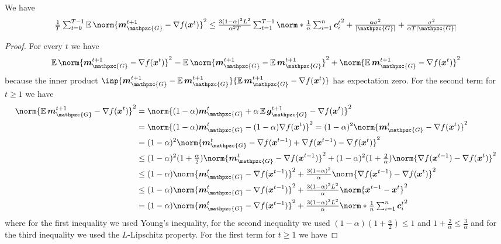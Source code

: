 \documentclass{article}
\newcommand{\gset}{\ensuremath{{\mathpzc{G}}}}
\begin{document}
\begin{lemma}\label{lem:momentum-minus-gradient}
  We have 
  \[
    \tfrac{1}{T} \tsum_{t=0}^{T-1} \E \norm{ \mm_\gset^{t+1} - \nabla f(\xx^t)}^2
     \le 
    \tfrac{3(1-\alpha)^2 L^2}{\alpha^2 T} \tsum_{t=1}^{T-1} \norm*{\tfrac{1}{n} \tsum_{i=1}^n \cc_i^t}^2    
    + \tfrac{\alpha \sigma^2}{|\gset|}
    + \tfrac{\sigma^2}{\alpha T |\gset|}
  \]
\end{lemma}

\begin{proof}
  For every $t$ we have
  \[
    \E \norm{ \mm_\gset^{t+1} - \nabla f(\xx^t) }^2
     =
    \E \norm{ \mm_\gset^{t+1} - \E \mm_\gset^{t+1} }^2
    + \norm{\E \mm_\gset^{t+1} - \nabla f(\xx^t)}^2
  \]
  because the inner product $\inp{ \mm_\gset^{t+1} - \E \mm_\gset^{t+1} }{ \E \mm_\gset^{t+1} - \nabla f(\xx^t) }$ has expectation zero. For the second term for $t \ge 1$ we have 
  \begin{align*}
    \norm{\E \mm_\gset^{t+1} - \nabla f(\xx^t)}^2
     &=
    \norm{(1-\alpha) \mm_\gset^{t} + \alpha \E \gg_\gset^{t+1} - \nabla f(\xx^t)}^2 
    \\ 
     &=
    \norm{(1-\alpha) \mm_\gset^{t} - (1-\alpha) \nabla f(\xx^t)}^2 
     =
    (1-\alpha)^2 \norm{\mm_\gset^{t} - \nabla f(\xx^t)}^2     
     \\
     &=
    (1-\alpha)^2 \norm{\mm_\gset^{t} - \nabla f(\xx^{t-1}) + \nabla f(\xx^{t-1}) - \nabla f(\xx^t)}^2   
    \\
     &\le 
    (1-\alpha)^2 (1+\tfrac{\alpha}{2}) \norm{\mm_\gset^{t} - \nabla f(\xx^{t-1})}^2 + (1-\alpha)^2 (1+\tfrac{2}{\alpha}) \norm{\nabla f(\xx^{t-1}) - \nabla f(\xx^t)}^2 
    \\
     &\le 
    (1-\alpha) \norm{\mm_\gset^{t} - \nabla f(\xx^{t-1})}^2 + \tfrac{3(1-\alpha)^2}{\alpha} \norm{\nabla f(\xx^{t-1}) - \nabla f(\xx^t)}^2 
    \\
     &\le 
    (1-\alpha) \norm{\mm_\gset^{t} - \nabla f(\xx^{t-1})}^2 + \tfrac{3(1-\alpha)^2 L^2}{\alpha} \norm{\xx^{t-1} - \xx^t}^2
    \\
     &=
    (1-\alpha) \norm{\mm_\gset^{t} - \nabla f(\xx^{t-1})}^2 
    + \tfrac{3(1-\alpha)^2 L^2}{\alpha} \norm*{\tfrac{1}{n} \tsum_{i=1}^n \cc_i^t}^2
  \end{align*}
  where for the first inequality we used Young's inequality, for the second inequality we used $(1-\alpha)(1+\tfrac{\alpha}{2}) \le 1$ and $1+\tfrac{2}{\alpha} \le \tfrac{3}{\alpha}$ and for the third inequality we used the $L$-Lipschitz property.
  For the first term for $t \ge 1$ we have

\end{proof}
\end{document}

